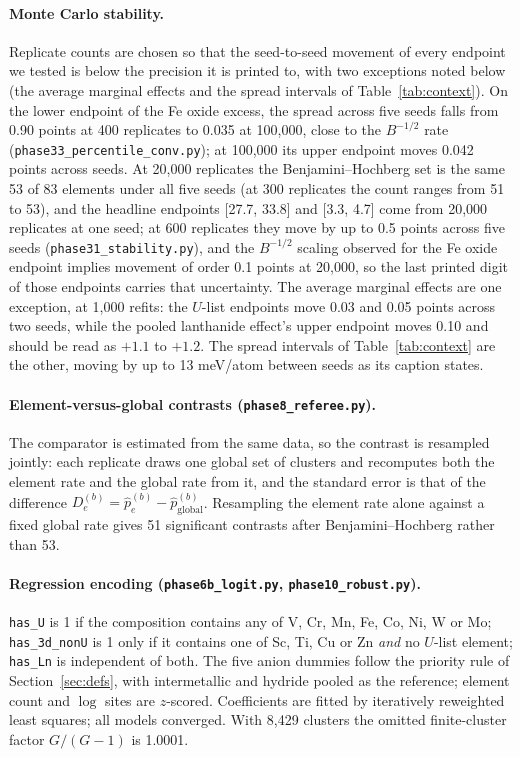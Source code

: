 \documentclass[11pt]{article}
\begin{document}
\paragraph{Monte Carlo stability.}\label{sec:mc} Replicate counts are chosen so that
the seed-to-seed movement of every endpoint we tested is below the precision it is printed
to, with two exceptions noted below (the average marginal effects and the spread
intervals of Table~\ref{tab:context}). On the lower endpoint of the Fe oxide excess, the spread across five seeds falls from
0.90 points at 400 replicates to 0.035 at 100{,}000, close to the $B^{-1/2}$ rate
(\texttt{phase33\_percentile\_conv.py}); at 100{,}000 its upper endpoint moves 0.042 points across seeds. At 20{,}000 replicates the Benjamini--Hochberg
set is the same 53 of 83 elements under all five seeds (at 300 replicates the count ranges from 51
to 53), and the
headline endpoints [27.7, 33.8] and [3.3, 4.7] come from 20{,}000 replicates at one
seed; at 600 replicates they move by up to 0.5 points across five seeds
(\texttt{phase31\_stability.py}), and the $B^{-1/2}$ scaling observed for the Fe oxide
endpoint implies movement of order 0.1 points at 20{,}000, so the last printed digit of
those endpoints carries that uncertainty. The
average marginal effects are one exception, at 1{,}000 refits: the $U$-list endpoints
move 0.03 and 0.05 points across two seeds, while the pooled lanthanide effect's upper
endpoint moves 0.10 and should be read as $+1.1$ to $+1.2$. The spread intervals of
Table~\ref{tab:context} are the other, moving by up to 13 meV/atom between seeds as its
caption states.

\paragraph{Element-versus-global contrasts (\texttt{phase8\_referee.py}).} The comparator
is estimated from the same data, so the contrast is resampled jointly: each replicate
draws one global set of clusters and recomputes both the element rate and the global
rate from it, and the standard error is that of the difference $D_e^{(b)} = \hat
p_e^{(b)} - \hat p_{\text{global}}^{(b)}$. Resampling the element rate alone against a
fixed global rate gives 51 significant contrasts after Benjamini--Hochberg rather than
53.

\paragraph{Regression encoding (\texttt{phase6b\_logit.py},
\texttt{phase10\_robust.py}).} \texttt{has\_U} is 1 if the composition contains any of
V, Cr, Mn, Fe, Co, Ni, W or Mo; \texttt{has\_3d\_nonU} is 1 only if it contains one of
Sc, Ti, Cu or Zn \emph{and} no $U$-list element; \texttt{has\_Ln} is independent of
both. The five anion dummies follow the priority rule of Section~\ref{sec:defs}, with
intermetallic and hydride pooled as the reference; element count and $\log$ sites are
$z$-scored. Coefficients are fitted by iteratively reweighted least squares; all models
converged. With 8{,}429 clusters the omitted finite-cluster factor $G/(G-1)$ is
1.0001.
\end{document}
